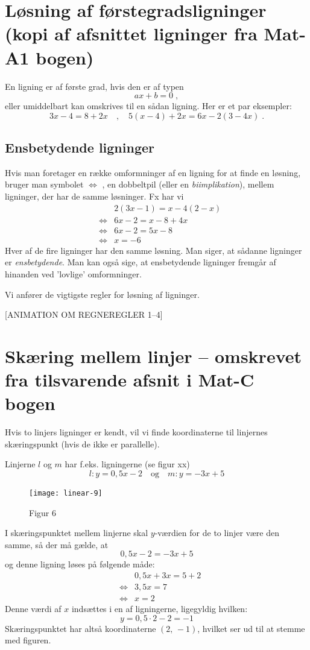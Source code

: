 \documentclass[12pt,oneside,a4paper]{article}
\newcommand{\bas}{\begin{eqnarray*}}
\newcommand{\eas}{\end{eqnarray*}}
\begin{document}
\section{Løsning af førstegradsligninger (kopi af afsnittet ligninger fra Mat-A1 bogen)}
En ligning er af første grad, hvis den er af typen
$$
ax + b = 0\; ,
$$
eller umiddelbart kan omskrives til en sådan ligning. Her er et par eksempler:
$$
3x - 4 = 8 + 2x \quad , \quad 5(x - 4) + 2x = 6x - 2(3 - 4x)\; .
$$

\subsection{Ensbetydende ligninger}
Hvis man foretager en række omformninger af en ligning for at finde en løsning,
bruger man symbolet $\iff$ , en dobbeltpil (eller en {\em biimplikation}), mellem
ligninger, der har de samme løsninger. Fx har vi
\bas
&& 2(3x - 1) = x - 4(2 - x)\\
&\iff& 6x - 2 = x - 8 + 4x\\
&\iff& 6x - 2 = 5x - 8 \\
&\iff& x = -6 
\eas
Hver af de fire ligninger har den samme løsning. Man siger, at sådanne
ligninger er {\em ensbetydende}. Man kan også sige, at ensbetydende ligninger fremgår
af hinanden ved ’lovlige’ omformninger.

Vi anfører de vigtigste regler for løsning af ligninger.

[ANIMATION OM REGNEREGLER 1--4]


\section{Skæring mellem linjer -- omskrevet fra tilsvarende afsnit i Mat-C bogen}
Hvis to linjers ligninger er kendt, vil vi finde koordinaterne til linjernes
skæringspunkt (hvis de ikke er parallelle).

Linjerne $l$ og $m$ har f.eks. ligningerne (se figur xx)
$$
l: y=0,5x-2\quad{\mbox{og}}\quad m: y=-3x+5
$$

\begin{figure}[ht]
    \centering
    \texttt{[image: linear-9]}
    \caption{Figur 6}
    \label{fig6}
\end{figure}

I skæringspunktet mellem linjerne skal $y$-værdien for de to linjer være den
samme, så der må gælde, at
$$
0,5x-2 = -3x+5
$$
og denne ligning løses på følgende måde:
\bas
&& 0,5x+3x=5+2\\
&\iff& 3,5x=7\\
&\iff& x=2
\eas
Denne værdi af $x$ indsættes i en af ligningerne, ligegyldig hvilken:
$$
y=0,5\cdot2-2=-1
$$
Skæringspunktet har altså koordinaterne $(2,\,-1)$, hvilket ser ud til at
stemme med figuren.
\end{document}
